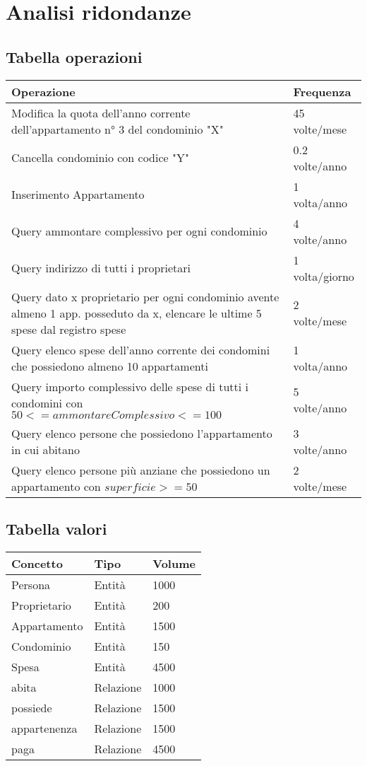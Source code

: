 \section{Analisi ridondanze}
\label{ridondanze}

\subsection{Tabella operazioni}


\begin{tabular}{|p{320pt}|l|}
	\hline
	\textbf{Operazione} & \textbf{Frequenza} \\ \hline
	Modifica la quota dell'anno corrente dell'appartamento n° 3 del condominio "X" & 45 volte/mese \\ \hline
	Cancella condominio con codice "Y" & 0.2 volte/anno \\ \hline
	Inserimento Appartamento & 1 volta/anno \\ \hline
	Query ammontare complessivo per ogni condominio & 4 volte/anno \\ \hline
	Query indirizzo di tutti i proprietari & 1 volta/giorno \\ \hline
	Query dato x proprietario per ogni condominio avente almeno 1 app. posseduto da x, elencare le ultime 5 spese dal registro spese & 2 volte/mese \\ \hline
	Query elenco spese dell'anno corrente dei condomini che possiedono almeno 10 appartamenti & 1 volta/anno \\ \hline
	Query importo complessivo delle spese di tutti i condomini con $50 <= ammontareComplessivo <= 100$ & 5 volte/anno \\ \hline
	Query elenco persone che possiedono l'appartamento in cui abitano & 3 volte/anno \\ \hline
	Query elenco persone più anziane che possiedono un appartamento con $superficie >= 50$ & 2 volte/mese \\ \hline
\end{tabular}

\subsection{Tabella valori}

\begin{tabular}{|l|l|l|}
	\hline
	Concetto & Tipo & Volume \\ \hline
	Persona & Entità & 1000 \\ \hline
	Proprietario & Entità & 200 \\ \hline
	Appartamento & Entità & 1500 \\ \hline
	Condominio & Entità & 150 \\ \hline
	Spesa & Entità & 4500 \\ \hline
	abita & Relazione & 1000 \\ \hline
	possiede & Relazione & 1500 \\ \hline
	appartenenza & Relazione & 1500 \\ \hline
	paga & Relazione & 4500 \\ \hline
\end{tabular}

